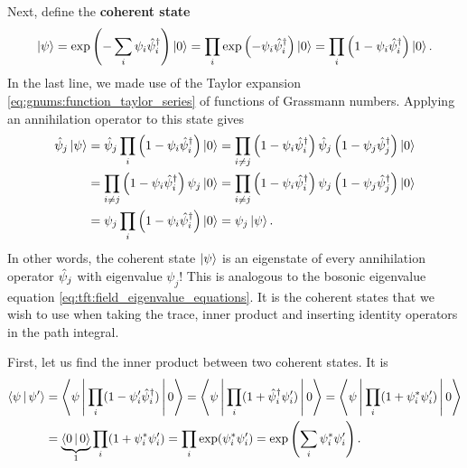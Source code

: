 Next, define the \textbf{coherent state}
\begin{equation}
	\ket{\psi} = \exp \left( -\sum_i \psi_i \hat\psi^\dagger_i \right) \ket{0} = \prod_i \exp \left( -\psi_i \hat\psi^\dagger_i \right) \ket{0} = \prod_i \left( 1 - \psi_i \hat\psi^\dagger_i \right) \ket{0} .
\end{equation}
In the last line, we made use of the Taylor expansion \eqref{eq:gnums:function_taylor_series} of functions of Grassmann numbers.
Applying an annihilation operator to this state gives
\begin{equation}
\begin{aligned}
	\hat\psi_j \ket{\psi} &= \hat\psi_j \prod_i \left( 1 - \psi_i \hat\psi^\dagger_i \right) \ket{0} = \prod_{i \neq j} \left( 1 - \psi_i \hat\psi^\dagger_i \right) \hat\psi_j \left( 1 - \psi_j \hat\psi^\dagger_j \right) \ket{0} \\
	                    &= \prod_{i \neq j} \left( 1 - \psi_i \hat\psi^\dagger_i \right) \psi_j \ket{0} = \prod_{i \neq j} \left( 1 - \psi_i \hat\psi^\dagger_i \right) \psi_j \left( 1 - \psi_j \hat\psi^\dagger_j \right) \ket{0}   \\
	                    &= \psi_j \prod_i \left( 1 - \psi_i \hat\psi^\dagger_i \right) \ket{0} = \psi_j \ket{\psi} . \\
\end{aligned}
\end{equation}
In other words, the coherent state $\ket{\psi}$ is an eigenstate of every annihilation operator $\hat\psi_j$ with eigenvalue $\psi_j$!
This is analogous to the bosonic eigenvalue equation \eqref{eq:tft:field_eigenvalue_equations}.
It is the coherent states that we wish to use when taking the trace, inner product and inserting identity operators in the path integral.

First, let us find the inner product between two coherent states.
It is
\begin{equation}
\begin{split}
	\iffalse
	\braket{\psi | \psi'} &= \braket{0 | \prod_i (1 - \destr_i \conj\psi_i) \prod_j (1 - \psi'_j \creat_j) | 0} \\
	                      &= \braket{0 | 0} + \sum_{i,j} \braket{0 | \destr_i \conj\psi_i \psi'_j \creat_j | 0}
	                       = \braket{0 | 0} + \sum_{i,j} \conj\psi_i \psi'_j \braket{0 | \destr_i \creat_j | 0} \\
	                      &= \braket{0 | 0} + \sum_{i  } \conj\psi_i \psi'_i
						   = 1 + \sum_i \conj\psi_i \psi'_i = \exp \left( \sum_i \conj\psi_i \psi'_i \right) .
	\fi
	\Braket{\psi | \psi'} &= \Braket{\psi | \prod_i (1 - \psi'_i \creat_i) | 0} = \Braket{\psi | \prod_i (1 + \creat_i \psi'_i) | 0} = \Braket{\psi | \prod_i (1 + \conj\psi_i \psi'_i) | 0} \\
						  &= \underbrace{\Braket{0 | 0}}_{1} \prod_i (1 + \conj\psi_i \psi'_i) = \prod_i \exp(\conj\psi_i \psi'_i) = \exp \left( \sum_i \conj\psi_i \psi'_i \right) .
\end{split}
\label{eq:tft:grassmann_inner_product_discrete}
\end{equation}

